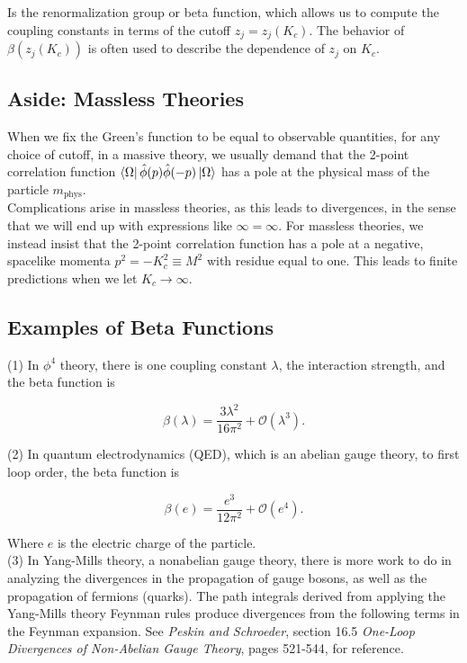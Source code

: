 \noindent Is the renormalization group or beta function, which allows us to compute the coupling constants in terms of the cutoff $z_j = z_j(K_c)$. The behavior of $\beta (z_j(K_c))$ is often used to describe the dependence of $z_j$ on $K_c$. \\

\subsection*{Aside: Massless Theories}

\noindent When we fix the Green's function to be equal to observable quantities, for any choice of cutoff, in a massive theory, we usually demand that the 2-point correlation function $\bra{\Omega} \hat{\phi} (p) \hat{\phi} (-p) \ket{\Omega}$ has a pole at the physical mass of the particle $m_{\text{phys}}$. \\

\noindent Complications arise in massless theories, as this leads to divergences, in the sense that we will end up with expressions like $\infty = \infty$. For massless theories, we instead insist that the 2-point correlation function has a pole at a negative, spacelike momenta $p^2 = -K_c^2 \equiv M^2$ with residue equal to one. This leads to finite predictions when we let $K_c \rightarrow \infty$.

\subsection*{Examples of Beta Functions}

\noindent (1) In $\phi^4$ theory, there is one coupling constant $\lambda$, the interaction strength, and the beta function is 

\begin{equation}
\beta(\lambda) = \frac{3 \lambda^2}{16 \pi^2} + \mathcal{O}(\lambda^3).
\end{equation}

\noindent (2) In quantum electrodynamics (QED), which is an abelian gauge theory, to first loop order, the beta function is 

\begin{equation}
\beta(e) = \frac{e^3}{12 \pi^2} + \mathcal{O}(e^4).
\end{equation}

\noindent Where $e$ is the electric charge of the particle. \\

\noindent (3) In Yang-Mills theory, a nonabelian gauge theory, there is more work to do in analyzing the divergences in the propagation of gauge bosons, as well as the propagation of fermions (quarks). The path integrals derived from applying the Yang-Mills theory Feynman rules produce divergences from the following terms in the Feynman expansion. See \textit{Peskin and Schroeder}, section 16.5 \textit{One-Loop Divergences of Non-Abelian Gauge Theory}, pages 521-544, for reference.


